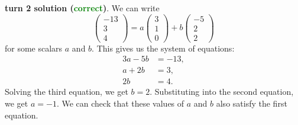 \begin{appendix}
\begin{tcolorbox}[enhanced=true,breakable=true,fontupper=\small,title=MATH Example 1]
\vspace{1em}
\textbf{\methodname{} turn 2 solution (\textcolor{green}{correct})}. 
We can write
\[\begin{pmatrix} -13 \\ 3 \\ 4 \end{pmatrix} = a \begin{pmatrix} 3 \\ 1 \\ 0 \end{pmatrix} + b \begin{pmatrix} -5 \\ 2 \\ 2 \end{pmatrix}\]for some scalars $a$ and $b.$  This gives us the system of equations:
\begin{align*}
3a - 5b &= -13, \\
a + 2b &= 3, \\
2b &= 4.
\end{align*}Solving the third equation, we get $b = 2.$  Substituting into the second equation, we get $a = -1.$  We can check that these values of $a$ and $b$ also satisfy the first equation.


\end{tcolorbox}
\end{appendix}

